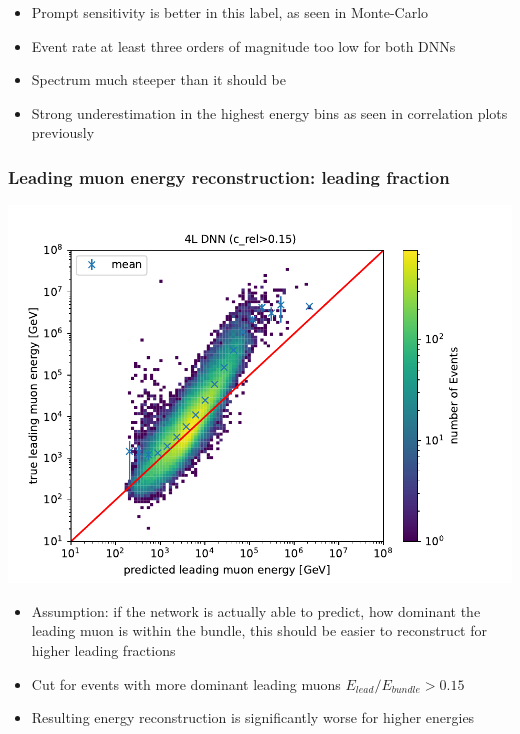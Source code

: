 \documentclass[aspectratio=1610, 9pt]{beamer}
\begin{document}
\begin{frame}
  \begin{itemize}
    \item Prompt sensitivity is better in this label, as seen in Monte-Carlo
    \item Event rate at least three orders of magnitude too low for both DNNs
    \item Spectrum much steeper than it should be
    \item Strong underestimation in the highest energy bins as seen in correlation plots previously
  \end{itemize}
\end{frame}
\begin{frame}
  \frametitle{Leading muon energy reconstruction: leading fraction}
  \includegraphics[scale=0.45]{Plots/spectrum_4L_entry_rel_cut}
  \begin{itemize}
    \item Assumption: if the network is actually able to predict, how dominant the leading muon is within the bundle, this should be easier to reconstruct for higher leading fractions
    \item Cut for events with more dominant leading muons $E_{lead}/E_{bundle}>\num{0.15}$
    \item Resulting energy reconstruction is significantly worse for higher energies
  \end{itemize}
\end{frame}
\end{document}
